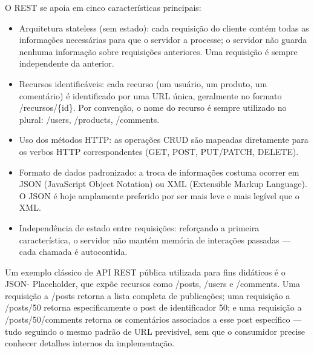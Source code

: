 O REST se apoia em cinco características principais:

\begin{itemize}
  \item Arquitetura stateless (sem estado): cada requisição do cliente contém todas as informações necessárias para que o servidor a processe; o servidor não guarda nenhuma informação sobre requisições anteriores. Uma requisição é sempre independente da anterior.
\end{itemize}

\begin{itemize}
  \item Recursos identificáveis: cada recurso (um usuário, um produto, um comentário) é identificado por uma URL única, geralmente no formato /recursos/\{id\}. Por convenção, o nome do recurso é sempre utilizado no plural: /users, /products, /comments.
\end{itemize}

\begin{itemize}
  \item Uso dos métodos HTTP: as operações CRUD são mapeadas diretamente para os verbos HTTP correspondentes (GET, POST, PUT/PATCH, DELETE).
\end{itemize}

\begin{itemize}
  \item Formato de dados padronizado: a troca de informações costuma ocorrer em JSON (JavaScript Object Notation) ou XML (Extensible Markup Language). O JSON é hoje amplamente preferido por ser mais leve e mais legível que o XML.
\end{itemize}

\begin{itemize}
  \item Independência de estado entre requisições: reforçando a primeira característica, o servidor não mantém memória de interações passadas — cada chamada é autocontida.
\end{itemize}

Um exemplo clássico de API REST pública utilizada para fins didáticos é o JSON- Placeholder, que expõe recursos como /posts, /users e /comments. Uma requisição a /posts retorna a lista completa de publicações; uma requisição a /posts/50 retorna especificamente o post de identificador 50; e uma requisição a /posts/50/comments retorna os comentários associados a esse post específico — tudo seguindo o mesmo padrão de URL previsível, sem que o consumidor precise conhecer detalhes internos da implementação.


